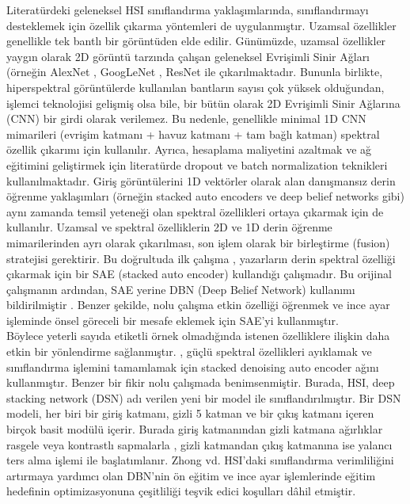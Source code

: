 	Literatürdeki geleneksel HSI sınıflandırma yaklaşımlarında, sınıflandırmayı desteklemek için özellik çıkarma yöntemleri de uygulanmıştır. Uzamsal özellikler genellikle tek bantlı bir görüntüden elde edilir. Günümüzde, uzamsal özellikler yaygın olarak 2D görüntü tarzında çalışan geleneksel Evrişimli Sinir Ağları (örneğin AlexNet \cite{NIPS2012_c399862d}, GoogLeNet \cite{szegedy2015going}, ResNet \cite{he2016deep} ile çıkarılmaktadır. Bununla birlikte, hiperspektral  görüntülerde kullanılan bantların sayısı çok yüksek olduğundan, işlemci teknolojisi gelişmiş olsa bile, bir bütün olarak 2D Evrişimli Sinir Ağlarına (CNN) bir girdi olarak verilemez. Bu nedenle, genellikle minimal 1D CNN mimarileri (evrişim katmanı + havuz katmanı + tam bağlı katman) \cite{hu2015deep} spektral özellik çıkarımı için kullanılır. Ayrıca, hesaplama maliyetini azaltmak ve ağ eğitimini geliştirmek için literatürde dropout ve batch normalization \cite{xu2014regression} teknikleri kullanılmaktadır. Giriş görüntülerini 1D vektörler olarak alan danışmansız derin öğrenme yaklaşımları (örneğin stacked auto encoders ve deep belief networks gibi) aynı zamanda temsil yeteneği olan spektral özellikleri ortaya çıkarmak için de kullanılır. Uzamsal ve spektral özelliklerin 2D ve 1D derin öğrenme mimarilerinden ayrı olarak çıkarılması, son işlem olarak bir birleştirme (fusion) stratejisi gerektirir.
	Bu doğrultuda ilk çalışma \cite{chen2014deep}, yazarların derin spektral özelliği çıkarmak için bir SAE (stacked auto encoder) kullandığı çalışmadır. Bu orijinal çalışmanın ardından, SAE yerine DBN (Deep Belief Network) kullanımı bildirilmiştir \cite{chen2015spectral}. Benzer şekilde, \cite{ma2016hyperspectral} nolu çalışma etkin özelliği öğrenmek ve ince ayar işleminde önsel göreceli bir mesafe eklemek için SAE'yi kullanmıştır.\\
	
Böylece yeterli sayıda etiketli örnek olmadığında istenen özelliklere ilişkin daha etkin bir
yönlendirme sağlanmıştır. \cite{xing2016stacked}, güçlü spektral özellikleri ayıklamak ve sınıflandırma işlemini tamamlamak için stacked denoising auto encoder ağını \cite{vincent2010stacked} kullanmıştır. Benzer bir fikir \cite{he2016hyperspectral} nolu çalışmada benimsenmiştir. Burada, HSI, deep stacking network (DSN) adı verilen yeni bir model ile sınıflandırılmıştır. Bir DSN modeli, her biri bir giriş katmanı, gizli 5 katman ve bir çıkış katmanı içeren birçok basit modülü içerir. Burada giriş katmanından gizli katmana ağırlıklar rasgele veya kontrastlı sapmalarla \cite{hinton2002training}, gizli katmandan çıkış katmanına ise yalancı ters alma işlemi ile başlatımlanır. Zhong vd. \cite{zhong2016diversified} HSI'daki sınıflandırma verimliliğini artırmaya yardımcı olan DBN'nin ön eğitim ve ince ayar işlemlerinde eğitim hedefinin optimizasyonuna çeşitliliği teşvik edici koşulları dâhil etmiştir.\\

